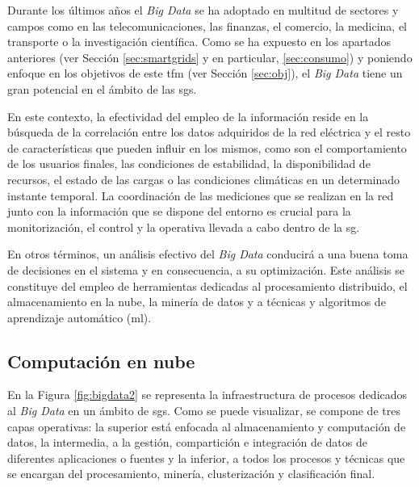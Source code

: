 \vspace{1mm}

Durante los últimos años el \textit{Big Data} se ha adoptado en multitud de sectores y campos como en las telecomunicaciones, las finanzas, el comercio, la medicina, el transporte o la investigación científica. Como se ha expuesto en los apartados anteriores (ver Sección \ref{sec:smartgrids} y en particular, \ref{sec:consumo}) y poniendo enfoque en los objetivos de este \gls{tfm} (ver Sección \ref{sec:obj}), el \textit{Big Data} tiene un gran potencial en el ámbito de las \gls{sg}s.

\vspace{3mm}

En este contexto, la efectividad del empleo de la información reside en la búsqueda de la correlación entre los datos adquiridos de la red eléctrica y el resto de características que pueden influir en los mismos, como son el comportamiento de los usuarios finales, las condiciones de estabilidad, la disponibilidad de recursos, el estado de las cargas o las condiciones climáticas en un determinado instante temporal. La coordinación de las mediciones que se realizan en la red junto con la información que se dispone del entorno es crucial para la monitorización, el control y la operativa llevada a cabo dentro de la \gls{sg}.~\cite{stab} 

\vspace{3mm}

En otros términos, un análisis efectivo del \textit{Big Data} conducirá a una buena toma de decisiones en el sistema y en consecuencia, a su optimización. Este análisis se constituye del empleo de herramientas dedicadas al procesamiento distribuido, el almacenamiento en la nube, la minería de datos y a técnicas y algoritmos de aprendizaje automático (\gls{ml}). 

\vspace{3mm}

\subsection{Computación en nube}

En la Figura \ref{fig:bigdata2} se representa la infraestructura de procesos dedicados al \textit{Big Data} en un ámbito de \gls{sg}s. Como se puede visualizar, se compone de tres capas operativas: la superior está enfocada al almacenamiento y computación de datos, la intermedia, a la gestión, compartición e integración de datos de diferentes aplicaciones o fuentes y la inferior, a todos los procesos y técnicas que se encargan del procesamiento, minería, clusterización y clasificación final. \cite{stab} 

